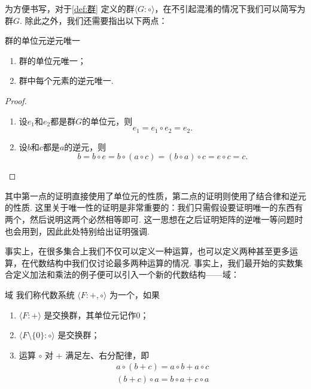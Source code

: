 为方便书写，对于\autoref{def:群} 定义的群$\langle G\colon\circ\rangle$，在不引起混淆的情况下我们可以简写为群$G$. 除此之外，我们还需要指出以下两点：
\begin{theorem}{}{群的单位元逆元唯一}
    \begin{enumerate}
        \item 群的单位元唯一；

        \item 群中每个元素的逆元唯一.
    \end{enumerate}
\end{theorem}

\begin{proof}
    \begin{enumerate}
        \item 设$e_1$和$e_2$都是群$G$的单位元，则
              \[e_1=e_1\circ e_2=e_2.\]

        \item 设$b$和$c$都是$a$的逆元，则
              \[b=b\circ e=b\circ(a\circ c)=(b\circ a)\circ c=e\circ c=c.\]
    \end{enumerate}
\end{proof}

其中第一点的证明直接使用了单位元的性质，第二点的证明则使用了结合律和逆元的性质. 这里关于唯一性的证明是非常重要的：我们只需假设要证明唯一的东西有两个，然后说明这两个必然相等即可. 这一思想在之后证明矩阵的逆唯一等问题时也会用到，因此此处特别给出证明强调.

事实上，在很多集合上我们不仅可以定义一种运算，也可以定义两种甚至更多运算，在代数结构中我们仅讨论最多两种运算的情况. 事实上，我们最开始的实数集合定义加法和乘法的例子便可以引入一个新的代数结构——域：
\begin{definition}{域}{} 
    我们称代数系统 $\langle F\colon+,\circ\rangle$ 为一个，如果
    \begin{enumerate}
        \item $\langle F\colon+\rangle$ 是交换群，其单位元记作0；

        \item $\langle F\setminus\{0\}\colon\circ\rangle$ 是交换群；

        \item 运算 $\circ$ 对 $+$ 满足左、右分配律，即
              \begin{gather*}
                  a \circ (b + c) = a \circ b + a \circ c \\
                  (b + c) \circ a = b \circ a + c \circ a
              \end{gather*}
    \end{enumerate}
\end{definition}

